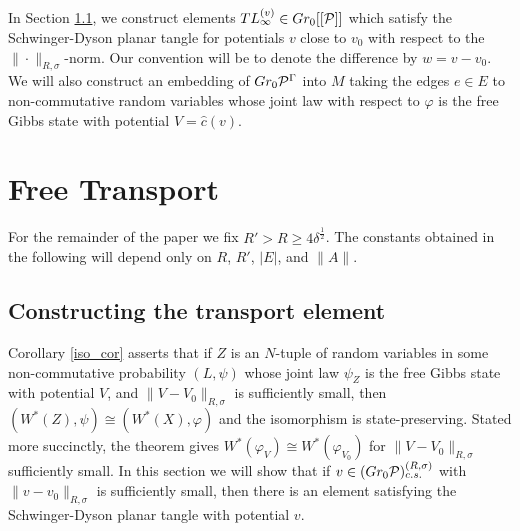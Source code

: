In  Section \ref{constructing_transport_element_section}, we construct elements $TL_\infty^{(v)}\in Gr_0[[\mathcal{P}]]$ which satisfy the Schwinger-Dyson planar tangle for potentials $v$ close to $v_0$ with respect to the $\|\cdot\|_{R,\sigma}$-norm. Our convention will be to denote the difference by $w=v-v_0$. We will also construct an embedding of $Gr_0\mathcal{P}^\Gamma$ into $M$ taking the edges $e\in E$ to non-commutative random variables whose joint law with respect to $\varphi$ is the free Gibbs state with potential $V=\hat{c}(v)$.




\section{Free Transport}

For the remainder of the paper we fix $R'>R\geq 4\delta^\frac{1}{2}$. The constants obtained in the following will depend only on $R$, $R'$, $|E|$, and $\|A\|$.



\subsection{Constructing the transport element}\label{constructing_transport_element_section}


Corollary \ref{iso_cor} asserts that if $Z$ is an $N$-tuple of random variables in some non-commutative probability $(L,\psi)$ whose joint law $\psi_Z$ is the free Gibbs state with potential $V$, and $\|V-V_0\|_{R,\sigma}$ is sufficiently small, then $(W^*(Z),\psi)\cong (W^*(X),\varphi)$ and the isomorphism is state-preserving. Stated more succinctly, the theorem gives $W^*(\varphi_V)\cong W^*(\varphi_{V_0})$ for $\|V-V_0\|_{R,\sigma}$ sufficiently small. In this section we will show that if $v\in (Gr_0 \mathcal{P})^{(R,\sigma)}_{c.s.}$ with $\|v-v_0\|_{R,\sigma}$ is sufficiently small, then there is an element satisfying the Schwinger-Dyson planar tangle with potential $v$.

